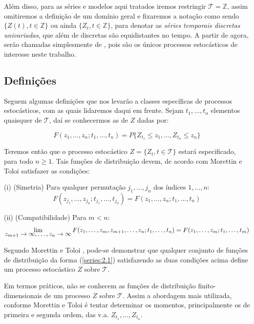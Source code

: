 Além disso, para as séries e modelos aqui tratados iremos restringir $\mathcal{T} = \mathbb{Z}$, assim omitiremos a definição de um domínio geral e fixaremos a notação como sendo $\{Z(t), t \in \mathbb{Z}\}$ ou ainda $\{Z_t, t \in \mathbb{Z}\}$, para denotar as \emph{séries temporais discretas univariadas}, que além de discretas são equidistantes no tempo. A partir de agora, serão chamadas simplesmente de , pois são os únicos processos estocásticos de interesse neste trabalho.

\subsection{Definições}

Seguem algumas definições que nos levarão a classes específicas de processos estocásticos, com as quais lidaremos daqui em frente. Sejam $t_1, \ldots, t_n$ elementos quaisquer de $\mathcal{T}$, daí se conhecermos as  de $Z$ dadas por:

\begin{equation}\label{series:2.1}
F(z_1, \ldots, z_n; t_1, \ldots, t_n) = P\{ Z_{t_1} \leq z_1, \ldots, Z_{t_n} \leq z_n \}
\end{equation}

Teremos então que o processo estocástico $Z = \{ Z_t, t \in \mathcal{T} \}$ estará especificado, para todo $n \geq 1$. Tais funções de distribuição devem, de acordo com Morettin e Toloi \citep{morettin} satisfazer as condições:

	(i) (Simetria) Para qualquer permutação $j_1, \ldots, j_n$ dos índices $1, \dots, n$:
\[ F(z_{j_1}, \ldots, z_{j_n}; t_{j_1}, \ldots, t_{j_n}) = F(z_1, \ldots, z_n; t_1, \ldots, t_n) \]

	(ii) (Compatibilidade) Para $m < n$:
\[ \lim_{\mathlarger{z_{m+1} \to \infty, \ldots, z_n \to \infty}} F(z_1, \ldots, z_m, z_{m+1}, \ldots, z_n; t_1, \ldots, t_n) = F(z_1, \ldots, z_m; t_1, \ldots, t_m) \]

Segundo Morettin e Toloi \citep{morettin}, pode-se demonstrar que qualquer conjunto de funções de distribuição da forma (\ref{series:2.1}) satisfazendo as duas condições acima define um processo estocástico $Z$ sobre $\mathcal{T}$.

Em termos práticos, não se conhecem as funções de distribuição finito-dimensionais de um processo $Z$ sobre $\mathcal{T}$. Assim a abordagem mais utilizada, conforme Morettin e Toloi \citep{morettin} é tentar determinar os momentos, principalmente os de primeira e segunda ordem, das v.a. $Z_{t_1}, \ldots, Z_{t_n}$. 

